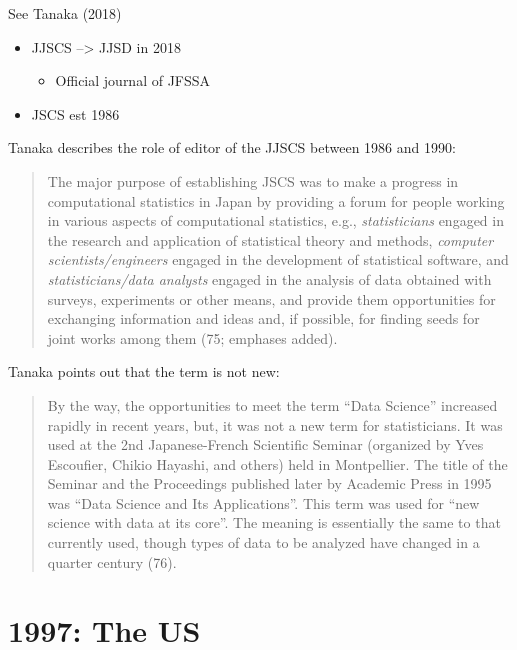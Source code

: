 \documentclass[
  letterpaper,
]{report}
\providecommand{\tightlist}{%
  \setlength{\itemsep}{0pt}\setlength{\parskip}{0pt}}\usepackage{longtable,booktabs,array}
\begin{document}
See Tanaka (2018)

\begin{itemize}
\tightlist
\item
  JJSCS --\textgreater{} JJSD in 2018

  \begin{itemize}
  \tightlist
  \item
    Official journal of JFSSA
  \end{itemize}
\item
  JSCS est 1986
\end{itemize}

Tanaka describes the role of editor of the JJSCS between 1986 and 1990:

\begin{quote}
The major purpose of establishing JSCS was to make a progress in
computational statistics in Japan by providing a forum for people
working in various aspects of computational statistics, e.g.,
\emph{statisticians} engaged in the research and application of
statistical theory and methods, \emph{computer scientists/engineers}
engaged in the development of statistical software, and
\emph{statisticians/data analysts} engaged in the analysis of data
obtained with surveys, experiments or other means, and provide them
opportunities for exchanging information and ideas and, if possible, for
finding seeds for joint works among them (75; emphases added).
\end{quote}

Tanaka points out that the term is not new:

\begin{quote}
By the way, the opportunities to meet the term ``Data Science''
increased rapidly in recent years, but, it was not a new term for
statisticians. It was used at the 2nd Japanese-French Scientific Seminar
(organized by Yves Escoufier, Chikio Hayashi, and others) held in
Montpellier. The title of the Seminar and the Proceedings published
later by Academic Press in 1995 was ``Data Science and Its
Applications''. This term was used for ``new science with data at its
core''. The meaning is essentially the same to that currently used,
though types of data to be analyzed have changed in a quarter century
(76).
\end{quote}

\hypertarget{the-us}{%
\section{1997: The US}\label{the-us}}
\end{document}
